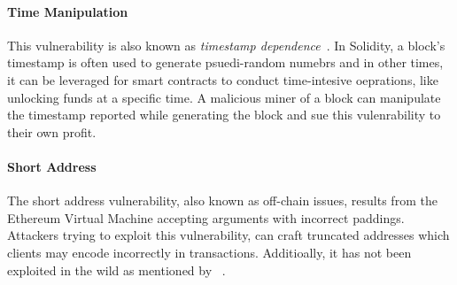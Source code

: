             \paragraph{Time Manipulation}
            This vulnerability is also known as \textit{timestamp dependence}~\cite{dasp}.
            In Solidity, a block's timestamp is often used to generate psuedi-random numebrs and in other times, it can be leveraged for smart contracts to conduct time-intesive oeprations, like unlocking funds at a specific time.
            A malicious miner of a block can manipulate the timestamp reported while generating the block and sue this vulenrability to their own profit. 
        
            \paragraph{Short Address}
            The short address vulnerability, also known as off-chain issues, results from the Ethereum Virtual Machine accepting arguments with incorrect paddings.
            Attackers trying to exploit this vulnerability, can craft truncated addresses which clients may encode incorrectly in transactions.
            Additioally, it has not been exploited in the wild as mentioned by ~\cite{ferreira2020smartbugs}.